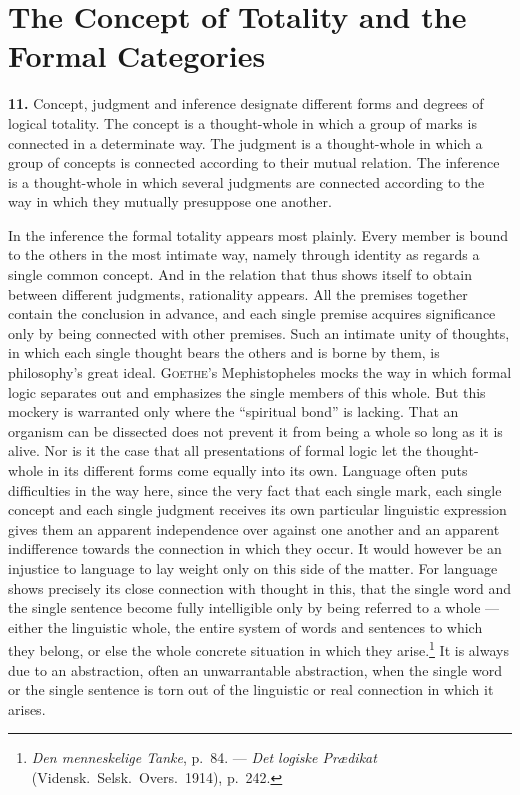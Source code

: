 \documentclass[12pt]{book}
\newcommand{\hnum}[1]{\textbf{#1.}\enspace}
\newcommand{\opage}[1]{\marginnote{\footnotesize\textit{[#1]}}}
\begin{document}
\chapter{The Concept of Totality and the Formal Categories}
\label{ch:3}

\hnum{11} Concept, judgment and inference designate different forms and degrees
of logical totality. The concept is a thought-whole in which a group of marks is
connected in a determinate way. The judgment is a thought-whole in which a group
of concepts is connected according to their mutual relation. The inference is a
thought-whole in which several judgments are connected according to the way in
which they mutually presuppose one another.

In the inference the formal totality appears most plainly. Every member is bound
to the others in the most intimate way, namely through identity as regards a
single common concept. And in the relation that thus shows itself to obtain
between different judgments, rationality appears. All the premises together
contain the conclusion in advance, and each single premise acquires significance
only by being connected with other premises. Such an intimate unity of thoughts,
in which each single thought bears the others and is borne by them, is
philosophy's great ideal. \textsc{Goethe}'s Mephistopheles mocks the way in which
formal logic separates out and emphasizes the single members of this whole. But
this mockery is warranted only where the ``spiritual bond'' is lacking. That an
organism can be dissected does not prevent it from being a whole so long as it is
alive. Nor is it the case that all presentations of formal logic let the
thought-whole in its different forms come equally into its own. Language often
puts difficulties in the way here, since the very fact that each single mark,
each single concept and each single judgment receives its own particular
linguistic expression gives them an apparent independence over against one
another and an apparent indifference towards the connection in which they occur.
It would however be an injustice to language to lay weight only on this side of
the matter. For language shows \opage{32}precisely its close connection with thought in
this, that the single word and the single sentence become fully intelligible only
by being referred to a whole --- either the linguistic whole, the entire system
of words and sentences to which they belong, or else the whole concrete situation
in which they arise.\footnote{\textit{Den menneskelige Tanke}, p.\ 84. ---
\textit{Det logiske Prædikat} (Vidensk.\ Selsk.\ Overs.\ 1914), p.\ 242.} It is
always due to an abstraction, often an unwarrantable abstraction, when the single
word or the single sentence is torn out of the linguistic or real connection in
which it arises.
\end{document}
